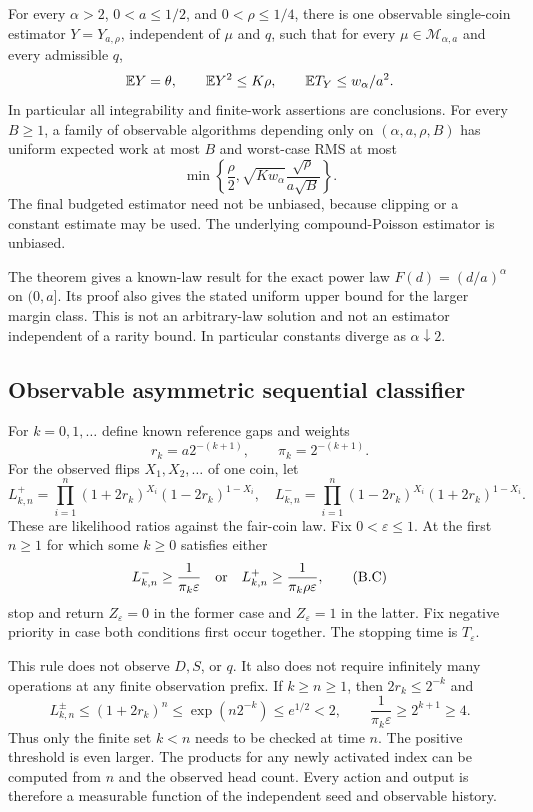 \begin{theorem}\label{above:thm:upper}
For every $\alpha>2$, $0<a\le1/2$, and $0<\rho\le1/4$, there is one observable
single-coin estimator $Y=Y_{a,\rho}$, independent of $\mu$ and $q$, such that
for every $\mu\in\mathcal M_{\alpha,a}$ and every admissible $q$,
\[
 \mathbb E Y=\theta,\qquad \mathbb E Y^2\le K\rho,\qquad
 \mathbb E T_Y\le w_\alpha/a^2.
\]
In particular all integrability and finite-work assertions are conclusions.
For every $B\ge1$, a family of observable algorithms depending only on
$(\alpha,a,\rho,B)$ has uniform expected work at most $B$ and worst-case RMS
at most
\[
 \min\left\{\frac\rho2,
       \sqrt{K w_\alpha}\frac{\sqrt\rho}{a\sqrt B}\right\}.
\]
The final budgeted estimator need not be unbiased, because clipping or a constant
estimate may be used. The underlying compound-Poisson estimator is unbiased.
\end{theorem}

The theorem gives a known-law result for the exact power law
$F(d)=(d/a)^\alpha$ on $(0,a]$. Its proof also gives the stated uniform upper
bound for the larger margin class. This is not an arbitrary-law solution and
not an estimator independent of a rarity bound. In particular constants diverge
as $\alpha\downarrow2$.

\subsection{Observable asymmetric sequential classifier}
For $k=0,1,\ldots$ define known reference gaps and weights
\[
 r_k=a2^{-(k+1)},\qquad \pi_k=2^{-(k+1)}.
\]
For the observed flips $X_1,X_2,\ldots$ of one coin, let
\[
 L^+_{k,n}=\prod_{i=1}^n(1+2r_k)^{X_i}(1-2r_k)^{1-X_i},\quad
 L^-_{k,n}=\prod_{i=1}^n(1-2r_k)^{X_i}(1+2r_k)^{1-X_i}.
\]
These are likelihood ratios against the fair-coin law. Fix $0<\varepsilon\le1$.
At the first $n\ge1$ for which some $k\ge0$ satisfies either
\[
 L^-_{k,n}\ge\frac1{\pi_k\varepsilon}
 \quad\hbox{or}\quad
 L^+_{k,n}\ge\frac1{\pi_k\rho\varepsilon},                 \tag{B.C}
\]
stop and return $Z_\varepsilon=0$ in the former case and $Z_\varepsilon=1$ in
the latter. Fix negative priority in case both conditions first occur together.
The stopping time is $T_\varepsilon$.

This rule does not observe $D,S$, or $q$. It also does not require infinitely
many operations at any finite observation prefix. If $k\ge n\ge1$, then
$2r_k\le2^{-k}$ and
\[
 L^{\pm}_{k,n}\le(1+2r_k)^n\le\exp(n2^{-k})\le e^{1/2}<2,
 \qquad \frac1{\pi_k\varepsilon}\ge2^{k+1}\ge4.
\]
Thus only the finite set $k<n$ needs to be checked at time $n$. The positive
threshold is even larger. The products for any newly activated index can be
computed from $n$ and the observed head count. Every action and output is
therefore a measurable function of the independent seed and observable history.

